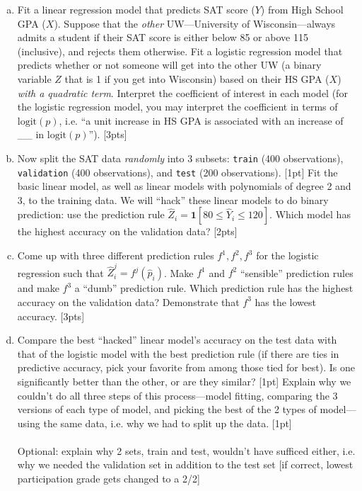 \documentclass[12pt]{article}
\newcommand{\Ind}{\textbf{1}}
\newcommand{\logit}{\text{logit}}
\begin{document}
\begin{enumerate}[(a)]
	\item Fit a linear regression model that predicts SAT score ($Y$) from High School GPA ($X$). Suppose that the \textit{other} UW---University of Wisconsin---always admits a student if their SAT score is either below 85 or above 115 (inclusive), and rejects them otherwise. Fit a logistic regression model that predicts whether or not someone will get into the other UW (a binary variable $Z$ that is 1 if you get into Wisconsin) based on their HS GPA ($X$) \textit{with a quadratic term}. Interpret the coefficient of interest in each model (for the logistic regression model, you may interpret the coefficient in terms of $\logit(p)$, i.e. ``a unit increase in HS GPA is associated with an increase of \_\_ in $\logit(p)$''). [3pts]
	\item Now split the SAT data \textit{randomly} into 3 subsets: \verb|train| (400 observations), \verb|validation| (400 observations), and \verb|test| (200 observations). [1pt] Fit the basic linear model, as well as linear models with polynomials of degree 2 and 3, to the training data. We will ``hack'' these linear models to do binary prediction: use the prediction rule $\hat{Z}_i = \Ind[80 \le \hat{Y}_i \le 120]$. Which model has the highest accuracy on the validation data? [2pts]
	\item Come up with three different prediction rules $f^1,f^2,f^3$ for the logistic regression such that $\hat{Z}_i^j = f^j(\hat{p}_i)$. Make $f^1$ and $f^2$ ``sensible'' prediction rules and make $f^3$ a ``dumb'' prediction rule. Which prediction rule has the highest accuracy on the validation data? Demonstrate that $f^3$ has the lowest accuracy. [3pts]
	\item Compare the best ``hacked'' linear model's accuracy on the test data with that of the logistic model with the best prediction rule (if there are ties in predictive accuracy, pick your favorite from among those tied for best). Is one significantly better than the other, or are they similar? [1pt] Explain why we couldn't do all three steps of this process---model fitting, comparing the 3 versions of each type of model, and picking the best of the 2 types of model---using the same data, i.e. why we had to split up the data. [1pt]\\\\ Optional: explain why 2 sets, train and test, wouldn't have sufficed either, i.e. why we needed the validation set in addition to the test set [if correct, lowest participation grade gets changed to a 2/2]
\end{enumerate}
\end{document}
